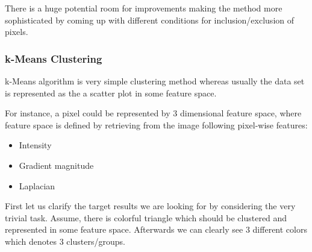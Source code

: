 There is a huge potential room for improvements making the method more sophisticated by coming up with different conditions for inclusion/exclusion of pixels.

\subsubsection{k-Means Clustering}
k-Means algorithm is very simple clustering method whereas usually the data set is represented as the a scatter plot in some feature space.

For instance, a pixel could be represented by 3 dimensional feature space, where feature space is defined by retrieving from the image following pixel-wise features:
\begin{itemize}
    \item Intensity
    \item Gradient magnitude
    \item Laplacian
\end{itemize}

First let us clarify the target results we are looking for by considering the very trivial task.
Assume, there is colorful triangle which should be clustered and represented in some feature space. Afterwards we can clearly see 3 different colors which denotes 3 clusters/groups.

